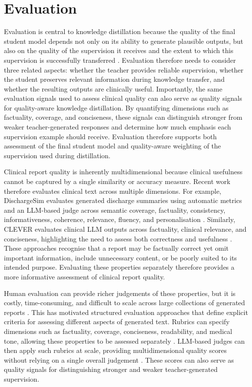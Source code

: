 \documentclass[ %
                    author={Aman Kumar Singh},
                supervisor={Dr. Edwin Simpson},
                    degree={MSc},
                     title={Quality-Aware Knowledge Distillation of Large Language Models for Efficient Personalised Clinical Report Generation},
                  subtitle={},
                      type={},
                      year={2021}]{dissertation}
\begin{document}
\section{Evaluation}
\label{sec:evaluation}

Evaluation is central to knowledge distillation because the quality of the
final student model depends not only on its ability to generate plausible
outputs, but also on the quality of the supervision it receives and the
extent to which this supervision is successfully transferred
\cite{wang_knowledge_2026}. Evaluation therefore needs to consider three
related aspects: whether the teacher provides reliable supervision, whether
the student preserves relevant information during knowledge transfer, and
whether the resulting outputs are clinically useful. Importantly, the same
evaluation signals used to assess clinical quality can also serve as quality
signals for quality-aware knowledge distillation. By quantifying dimensions
such as factuality, coverage, and conciseness, these signals can distinguish
stronger from weaker teacher-generated responses and determine how much
emphasis each supervision example should receive. Evaluation therefore
supports both assessment of the final student model and quality-aware
weighting of the supervision used during distillation.

Clinical report quality is inherently multidimensional because clinical
usefulness cannot be captured by a single similarity or accuracy measure.
Recent work therefore evaluates clinical text across multiple dimensions.
For example, DischargeSim evaluates generated discharge summaries using
automatic metrics and an LLM-based judge across semantic coverage,
factuality, consistency, informativeness, coherence, relevance, fluency,
and personalisation \cite{yao_dischargesim_2025}. Similarly, CLEVER evaluates
clinical LLM outputs across factuality, clinical relevance, and conciseness,
highlighting the need to assess both correctness and usefulness
\cite{kocaman_clinical_2025}. These approaches recognise that a report may
be factually correct yet omit important information, include unnecessary
content, or be poorly suited to its intended purpose. Evaluating these
properties separately therefore provides a more informative assessment of
clinical report quality.

Human evaluation can provide richer judgements of these properties, but it
is costly, time-consuming, and difficult to scale across large collections
of generated reports \cite{yan_automatic_2026}. This has motivated structured
evaluation approaches that define explicit criteria for assessing different
aspects of generated text. Rubrics can specify dimensions such as factuality,
coverage, conciseness, readability, and medical tone, allowing these
properties to be assessed separately \cite{chen_automated_2026}. LLM-based
judges can then apply such rubrics at scale, providing multidimensional
quality scores without relying on a single overall judgement \cite{hashemi_llm-rubric_2024}. These scores
can also serve as quality signals for distinguishing stronger and weaker
teacher-generated supervision.
\end{document}
